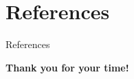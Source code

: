 \documentclass{beamer}
\begin{document}
    \section{References}

    \begin{frame}[allowframebreaks]{References}
        \printbibliography[heading=none]
    \end{frame}
    
    \begin{frame}[c]
        \centering
        \hspace{-50pt}\Large \textbf{Thank you for your time!}
    \end{frame}
\end{document}
